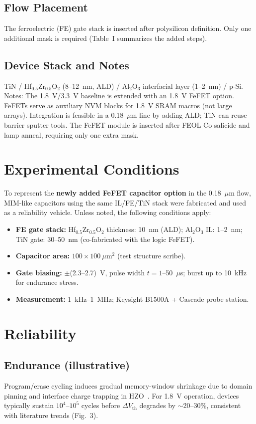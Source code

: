 \documentclass[conference]{IEEEtran}
\begin{document}
\subsection{Flow Placement}
The ferroelectric (FE) gate stack is inserted after polysilicon definition. Only one additional mask is required (Table~I summarizes the added steps).

\subsection{Device Stack and Notes}
TiN / Hf$_{0.5}$Zr$_{0.5}$O$_2$ (8--12~nm, ALD) / Al$_2$O$_3$ interfacial layer (1--2~nm) / p-Si. Notes: The 1.8~V/3.3~V baseline is extended with an 1.8~V FeFET option. FeFETs serve as auxiliary NVM blocks for 1.8~V SRAM macros (not large arrays). Integration is feasible in a 0.18~$\mu$m line by adding ALD; TiN can reuse barrier sputter tools. The FeFET module is inserted after FEOL Co salicide and lamp anneal, requiring only one extra mask.

\section{Experimental Conditions}
To represent the \textbf{newly added FeFET capacitor option} in the 0.18~$\mu$m flow, MIM-like capacitors using the same IL/FE/TiN stack were fabricated and used as a reliability vehicle. Unless noted, the following conditions apply:
\begin{itemize}
  \item \textbf{FE gate stack:} Hf$_{0.5}$Zr$_{0.5}$O$_2$ thickness: 10~nm (ALD); Al$_2$O$_3$ IL: 1--2~nm; TiN gate: 30--50~nm (co-fabricated with the logic FeFET).
  \item \textbf{Capacitor area:} $100 \times 100~\mu$m$^2$ (test structure scribe).
  \item \textbf{Gate biasing:} $\pm$(2.3--2.7)~V, pulse width $t = 1$--50~$\mu$s; burst up to 10~kHz for endurance stress.
  \item \textbf{Measurement:} 1~kHz--1~MHz; Keysight B1500A + Cascade probe station.
\end{itemize}

\section{Reliability}
\subsection{Endurance (illustrative)}
Program/erase cycling induces gradual memory-window shrinkage due to domain pinning and interface charge trapping in HZO~\cite{Boscke2011,Mueller2012}. For 1.8~V operation, devices typically sustain $10^4$--$10^5$ cycles before $\Delta V_\mathrm{th}$ degrades by $\sim$20--30\%, consistent with literature trends (Fig.~3).
\end{document}
